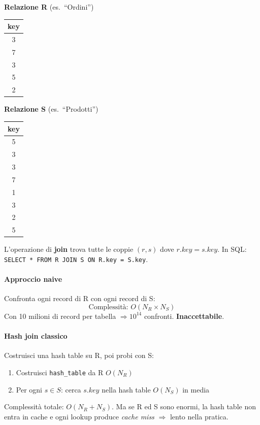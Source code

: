 \documentclass[11pt,a4paper]{article}
\begin{document}
\begin{center}
\begin{minipage}[t]{0.35\textwidth}
\centering
\textbf{Relazione R} (es.\ ``Ordini'')\\[4pt]
\begin{tabular}{|c|}
\hline
\textbf{key}\\\hline
3\\7\\3\\5\\2\\\hline
\end{tabular}
\end{minipage}
\hfill
\begin{minipage}[t]{0.35\textwidth}
\centering
\textbf{Relazione S} (es.\ ``Prodotti'')\\[4pt]
\begin{tabular}{|c|}
\hline
\textbf{key}\\\hline
5\\3\\3\\7\\1\\3\\2\\5\\\hline
\end{tabular}
\end{minipage}
\end{center}

\medskip
L'operazione di \textbf{join} trova tutte le coppie $(r,s)$ dove $r.\mathit{key} = s.\mathit{key}$. In SQL: \texttt{SELECT * FROM R JOIN S ON R.key = S.key}.

\paragraph{Approccio naive} Confronta ogni record di R con ogni record di S:
\[
\text{Complessità: } O(N_R \times N_S)
\]
Con 10 milioni di record per tabella $\Rightarrow 10^{14}$ confronti. \textbf{Inaccettabile}.

\paragraph{Hash join classico} Costruisci una hash table su R, poi probi con S:
\begin{enumerate}[nosep]
  \item Costruisci \texttt{hash\_table} da R \hfill $O(N_R)$
  \item Per ogni $s \in S$: cerca $s.\mathit{key}$ nella hash table \hfill $O(N_S)$ in media
\end{enumerate}
Complessità totale: $O(N_R + N_S)$. Ma se R ed S sono enormi, la hash table non entra in cache e ogni lookup produce \emph{cache miss} $\Rightarrow$ lento nella pratica.
\end{document}
